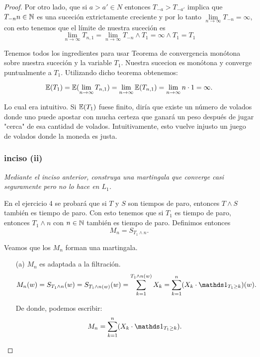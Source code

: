 \begin{proof}
		Por otro lado, que si $a>a' \in N$ entonces $T_{-a} > T_{-a'}$ implica que $T_{-n} n \in \mathbb{N}$ es 
		una suceción extrictamente creciente y por lo tanto 
		$\lim\limits_{n \rightarrow \infty} T_{-n} = \infty$, con esto tenemos que el límite de nuestra 
		suceción es 
		$$		
		\lim_{n\rightarrow\infty} T_{n,1} = 
		\lim_{n\rightarrow\infty} T_{-n} \wedge T_1 = 
		\infty \wedge T_1 = 
		T_1
		$$

		Tenemos todos los ingredientes para usar Teorema de convergencia monótona sobre nuestra suceción
		y la variable $T_1$. Nuestra sucecion es monótona y converge puntualmente a $T_1$. Utilizando
		dicho teorema obtenemos:
		
		$$
		\mathbb{E}(T_1) = 
		\mathbb{E}(\lim_{n\rightarrow\infty} T_{n,1}) = 
		\lim_{n\rightarrow\infty} \mathbb{E}(T_{n,1}) = 
		\lim_{n\rightarrow\infty} n\cdot 1 =
		\infty.
		$$
		
		Lo cual era intuitivo. Si $\mathbb{E}(T_1)$ fuese finito, diría que existe un número de volados donde
		uno puede apostar con mucha certeza que ganará un peso después de jugar "cerca" de esa cantidad
		de volados. Intuitivamente, esto vuelve injusto un juego de volados donde la moneda es
		justa.\\
		
	\subsubsection{inciso (ii)}
	\emph
	{	
		Mediante el inciso anterior, construya una martingala que converge 
		casi seguramente pero no lo hace en $L_1$.\\
	}
		
		En el ejercicio 4 se probará que si $T$ y $S$ son tiempos de paro, entonces $T\wedge S$ también 
		es tiempo de paro. Con esto tenemos que si $T_1$ es tiempo de paro, entonces $T_1 \wedge n$ con 
		$n \in \mathbb{N}$ también es tiempo de paro. Definimos entonces 
		$$M_n = S_{T_1 \wedge n}.$$
		
		Veamos que los $M_n$ forman una martingala.
		
		\begin{itemize}
			\item[(a)] 
				$M_n$ es adaptada a la filtración.
				\begin{align}
					M_n(w) = S_{T_1 \wedge n}(w) = 
					S_{T_1 \wedge n (w)}(w) = 
					\sum_{k=1}^{T_1 \wedge n (w)} X_k = 
					\sum_{k=1}^{n} (X_k \cdot \indic_{T_1 \geq k})(w).
				\end{align}
				
				De donde, podemos escribir:
				\begin{align}\label{problema1_3:descomposicion_de_M_n}
					M_n = \sum_{k=1}^{n} (X_k \cdot \indic_{T_1 \geq k}).
				\end{align}								 		
				

\end{itemize}
\end{proof}
